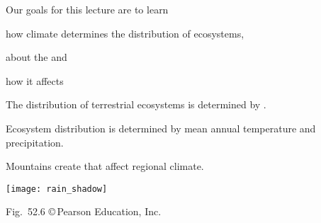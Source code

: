 \documentclass[t]{beamer}
\begin{document}

\begin{frame}{Our goals for this lecture are to learn}

	\hangpara how climate determines the distribution of ecosystems,
	
	
	\hangpara about the  and
	
	\hangpara how it affects  
	
\end{frame}
%
{
	\begin{frame}[b]{The distribution of terrestrial ecosystems is determined by .}
		
	\end{frame}
}
%


%		
%		
%		
%		


{
	\begin{frame}[b]{Ecosystem distribution is determined by mean annual temperature and precipitation.}
		
	\end{frame}
}
%
\begin{frame}[t]{Mountains create  that affect regional climate.}
	
	\bigskip
	
	\texttt{[image: rain\_shadow]}
	
	\vfilll
	
	\hfill \tiny Fig.~52.6 \copyright\,Pearson Education, Inc.
\end{frame}
%
{
	\begin{frame}[b]
		
	\end{frame}
}
\end{document}
